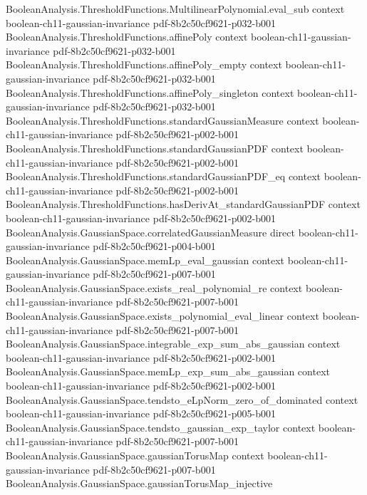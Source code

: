 \begin{theorem}
\proofstep
  {BooleanAnalysis.ThresholdFunctions.MultilinearPolynomial.eval_sub}
  {context}
  {boolean-ch11-gaussian-invariance}
  {pdf-8b2c50cf9621-p032-b001}
\proofstep
  {BooleanAnalysis.ThresholdFunctions.affinePoly}
  {context}
  {boolean-ch11-gaussian-invariance}
  {pdf-8b2c50cf9621-p032-b001}
\proofstep
  {BooleanAnalysis.ThresholdFunctions.affinePoly_empty}
  {context}
  {boolean-ch11-gaussian-invariance}
  {pdf-8b2c50cf9621-p032-b001}
\proofstep
  {BooleanAnalysis.ThresholdFunctions.affinePoly_singleton}
  {context}
  {boolean-ch11-gaussian-invariance}
  {pdf-8b2c50cf9621-p032-b001}
\proofstep
  {BooleanAnalysis.ThresholdFunctions.standardGaussianMeasure}
  {context}
  {boolean-ch11-gaussian-invariance}
  {pdf-8b2c50cf9621-p002-b001}
\proofstep
  {BooleanAnalysis.ThresholdFunctions.standardGaussianPDF}
  {context}
  {boolean-ch11-gaussian-invariance}
  {pdf-8b2c50cf9621-p002-b001}
\proofstep
  {BooleanAnalysis.ThresholdFunctions.standardGaussianPDF_eq}
  {context}
  {boolean-ch11-gaussian-invariance}
  {pdf-8b2c50cf9621-p002-b001}
\proofstep
  {BooleanAnalysis.ThresholdFunctions.hasDerivAt_standardGaussianPDF}
  {context}
  {boolean-ch11-gaussian-invariance}
  {pdf-8b2c50cf9621-p002-b001}
\proofstep
  {BooleanAnalysis.GaussianSpace.correlatedGaussianMeasure}
  {direct}
  {boolean-ch11-gaussian-invariance}
  {pdf-8b2c50cf9621-p004-b001}
\proofstep
  {BooleanAnalysis.GaussianSpace.memLp_eval_gaussian}
  {context}
  {boolean-ch11-gaussian-invariance}
  {pdf-8b2c50cf9621-p007-b001}
\proofstep
  {BooleanAnalysis.GaussianSpace.exists_real_polynomial_re}
  {context}
  {boolean-ch11-gaussian-invariance}
  {pdf-8b2c50cf9621-p007-b001}
\proofstep
  {BooleanAnalysis.GaussianSpace.exists_polynomial_eval_linear}
  {context}
  {boolean-ch11-gaussian-invariance}
  {pdf-8b2c50cf9621-p007-b001}
\proofstep
  {BooleanAnalysis.GaussianSpace.integrable_exp_sum_abs_gaussian}
  {context}
  {boolean-ch11-gaussian-invariance}
  {pdf-8b2c50cf9621-p002-b001}
\proofstep
  {BooleanAnalysis.GaussianSpace.memLp_exp_sum_abs_gaussian}
  {context}
  {boolean-ch11-gaussian-invariance}
  {pdf-8b2c50cf9621-p002-b001}
\proofstep
  {BooleanAnalysis.GaussianSpace.tendsto_eLpNorm_zero_of_dominated}
  {context}
  {boolean-ch11-gaussian-invariance}
  {pdf-8b2c50cf9621-p005-b001}
\proofstep
  {BooleanAnalysis.GaussianSpace.tendsto_gaussian_exp_taylor}
  {context}
  {boolean-ch11-gaussian-invariance}
  {pdf-8b2c50cf9621-p007-b001}
\proofstep
  {BooleanAnalysis.GaussianSpace.gaussianTorusMap}
  {context}
  {boolean-ch11-gaussian-invariance}
  {pdf-8b2c50cf9621-p007-b001}
\proofstep
  {BooleanAnalysis.GaussianSpace.gaussianTorusMap_injective}

\end{theorem}
